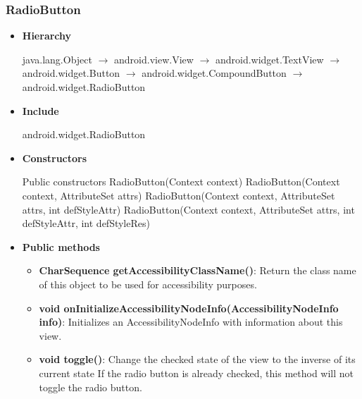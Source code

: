 \documentclass{report}
\begin{document}
    \subsubsection{RadioButton}
    \begin{itemize}
        \item \textbf{Hierarchy} 
            \begin{center}
                java.lang.Object $\to$	android.view.View $\to$	android.widget.TextView $\to$	android.widget.Button $\to$	android.widget.CompoundButton $\to$	android.widget.RadioButton
            \end{center}
        \item \textbf{Include}
            \bigbreak \noindent 
            \begin{javacode}
                android.widget.RadioButton
            \end{javacode}
        \item \textbf{Constructors}
            \bigbreak \noindent 
            \begin{javacode}
                Public constructors
                RadioButton(Context context)
                RadioButton(Context context, AttributeSet attrs)
                RadioButton(Context context, AttributeSet attrs, int defStyleAttr)
                RadioButton(Context context, AttributeSet attrs, int defStyleAttr, int defStyleRes)
            \end{javacode}
        \item \textbf{Public methods}
            \begin{itemize}
                \item \textbf{CharSequence getAccessibilityClassName()}: Return the class name of this object to be used for accessibility purposes.
                \item \textbf{void onInitializeAccessibilityNodeInfo(AccessibilityNodeInfo info)}: Initializes an AccessibilityNodeInfo with information about this view.
                \item \textbf{void toggle()}: Change the checked state of the view to the inverse of its current state
                    \bigbreak \noindent 
                    If the radio button is already checked, this method will not toggle the radio button.
            \end{itemize}

    \end{itemize}

    \pagebreak 
\end{document}
